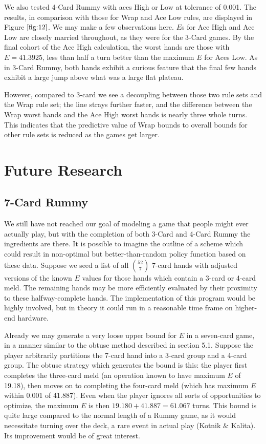 \documentclass[letter,12pt]{article}
\begin{document}
We also tested 4-Card Rummy with aces High or Low at tolerance of 0.001. The results, in comparison with those for Wrap and Ace Low rules, are displayed in Figure $\ref{fig:12}$. We may make a few observations here. $E$s for Ace High and Ace Low are closely married throughout, as they were for the 3-Card games. By the final cohort of the Ace High calculation, the worst hands are those with $E = 41.3925$, less than half a turn better than the maximum $E$ for Aces Low. As in 3-Card Rummy, both hands exhibit a curious feature that the final few hands exhibit a large jump above what was a large flat plateau.

However, compared to 3-card we see a decoupling between those two rule sets and the Wrap rule set; the line strays further faster, and the difference between the Wrap worst hands and the Ace High worst hands is nearly three whole turns. This indicates that the predictive value of Wrap bounds to overall bounds for other rule sets is reduced as the games get larger.

\section{Future Research}

\subsection{7-Card Rummy}

We still have not reached our goal of modeling a game that people might ever actually play, but with the completion of both 3-Card and 4-Card Rummy the ingredients are there. It is possible to imagine the outline of a scheme which could result in non-optimal but better-than-random policy function based on these data. Suppose we seed a list of all $\binom{52}{7}$ 7-card hands with adjusted versions of the known $E$ values for those hands which contain a 3-card or 4-card meld. The remaining hands may be more efficiently evaluated by their proximity to these halfway-complete hands. The implementation of this program would be highly involved, but in theory it could run in a reasonable time frame on higher-end hardware.

Already we may generate a very loose upper bound for $E$ in a seven-card game, in a manner similar to the obtuse method described in section 5.1. Suppose the player arbitrarily partitions the 7-card hand into a 3-card group and a 4-card group. The obtuse strategy which generates the bound is this: the player first completes the three-card meld (an operation known to have maximum $E$ of 19.18), then moves on to completing the four-card meld (which has maximum $E$ within 0.001 of 41.887). Even when the player ignores all sorts of opportunities to optimize, the maximum $E$ is then $19.180 + 41.887 = 61.067$ turns. This bound is quite large compared to the normal length of a Rummy game, as it would necessitate turning over the deck, a rare event in actual play (Kotnik $\&$ Kalita). Its improvement would be of great interest.
\end{document}
